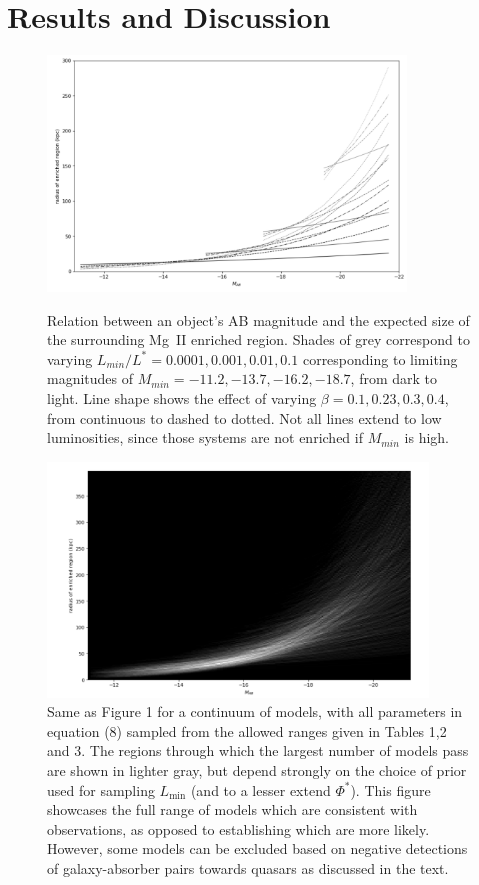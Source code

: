 \documentclass[useAMS,usenatbib]{mn2e}
\newcommand{\magtwo}{Mg~{\small II} }
\begin{document}
\section{Results and Discussion}



\begin{figure}
\includegraphics[width=0.85\textwidth]{plots/MgII_few.png}
\caption{Relation between an object's AB magnitude and the expected size of the surrounding \magtwo enriched region. Shades of grey correspond to varying $L_{min}/L^*=0.0001,0.001,0.01,0.1$ corresponding to limiting magnitudes of $M_{min} = -11.2, -13.7, -16.2, -18.7$, from dark to light. Line shape shows the effect of varying $\beta=0.1,0.23,0.3,0.4$, from continuous to dashed to dotted. Not all lines extend to low luminosities, since those systems are not  enriched if $M_{min}$ is high.}
\includegraphics[width=0.9\textwidth]{plots/MgII_range.png}
\caption{Same as Figure 1 for a continuum of models, with all parameters in equation (8) sampled from the allowed ranges given in Tables 1,2 and 3. The regions through which the largest number of models pass are shown in lighter gray, but depend strongly on the choice of prior used for sampling $L_\text{min}$ (and to a lesser extend $\Phi^*$). This figure showcases the full range of models which are consistent with observations, as opposed to establishing which are more likely. However, some models can be excluded based on negative detections of galaxy-absorber pairs towards quasars as discussed in the text.}
\end{figure}
\end{document}
